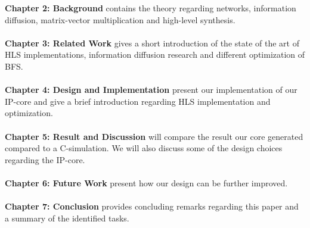 \textbf{Chapter 2: Background} contains the theory regarding networks, information diffusion, matrix-vector multiplication and high-level synthesis. \\ \hfil \\ \hfil
\textbf{Chapter 3: Related Work} gives a short introduction of the state of the art of HLS implementations, information diffusion research and different optimization of BFS.\\ \hfil \\ \hfil
\textbf{Chapter 4: Design and Implementation} present our implementation of our IP-core and give a brief introduction regarding HLS implementation and optimization.  \\ \hfil \\ \hfil
\textbf{Chapter 5: Result and Discussion} will compare the result our core generated compared to a C-simulation. We will also discuss some of the design choices regarding the IP-core. \\ \hfil \\ \hfil
\textbf{Chapter 6: Future Work} present how our design can be further improved. \\ \hfil \\ \hfil
\textbf{Chapter 7: Conclusion} provides concluding remarks regarding this paper and a summary of the identified tasks. \\ \hfil \\ \hfil